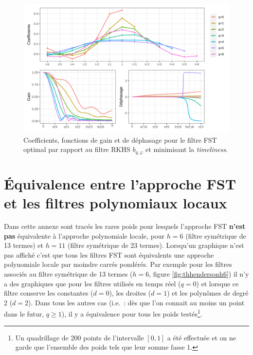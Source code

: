 \documentclass[
  11pt,
  french,
  a4paper]{article}
\newcommand\1{\mathds{1}}
\begin{document}
\begin{figure}[H]

{\centering \includegraphics[width=1\linewidth]{img/filters_used/fst_rkhs_timeliness} 

}

\caption[Coefficients, fonctions de gain et de déphasage pour le filtre FST optimal par rapport au filtre RKHS \(b_{q,\varphi}\) et minimisant la \emph{timeliness}]{Coefficients, fonctions de gain et de déphasage pour le filtre FST optimal par rapport au filtre RKHS \(b_{q,\varphi}\) et minimisant la \emph{timeliness}.}\label{fig:graphsfstrkhs}

\footnotesize
\normalsize\end{figure}

\newpage

\hypertarget{an-equivfstlp}{%
\section{Équivalence entre l'approche FST et les filtres polynomiaux locaux}\label{an-equivfstlp}}

Dans cette annexe sont tracés les rares poids pour lesquels l'approche FST \textbf{n'est pas} équivalente à l'approche polynomiale locale, pour \(h=6\) (filtre symétrique de 13 termes) et \(h=11\) (filtre symétrique de 23 termes).
Lorsqu'un graphique n'est pas affiché c'est que tous les filtres FST sont équivalents une approche polynomiale locale par moindre carrés pondérés.
Par exemple pour les filtres associés au filtre symétrique de 13 termes (\(h=6\), figure \ref{fig:thhendersonh6}) il n'y a des graphiques que pour les filtres utilisés en temps réel (\(q=0\)) et lorsque ce filtre conserve les constantes (\(d=0\)), les droites (\(d=1\)) et les polynômes de degré 2 (\(d=2\)).
Dans tous les autres cas (i.e.~: dès que l'on connait au moins un point dans le futur, \(q\geq 1\)), il y a équivalence pour tous les poids testés\footnote{
  Un quadrillage de 200 points de l'intervalle \([0,1]\) a été effectuée et on ne garde que l'ensemble des poids tels que leur somme fasse 1.}.
\end{document}
